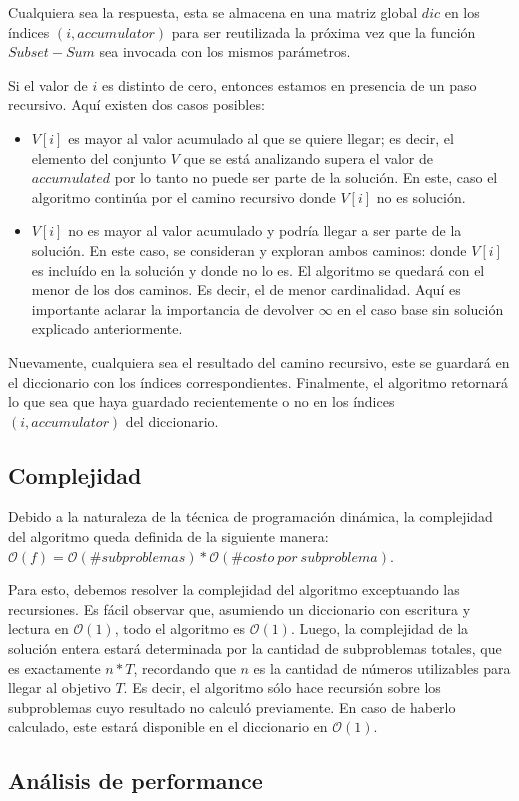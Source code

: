 Cualquiera sea la respuesta, esta se almacena en una matriz global $dic$ en los índices $(i, accumulator)$ para ser reutilizada la próxima vez que la función $Subset-Sum$ sea invocada con los mismos parámetros.

\vskip 8pt

Si el valor de $i$ es distinto de cero, entonces estamos en presencia de un paso recursivo. Aquí existen dos casos posibles:
\begin{itemize}
	\item $V[i]$ es mayor al valor acumulado al que se quiere llegar; es decir, el elemento del conjunto $V$ que se está analizando supera el valor de $accumulated$ por lo tanto no puede ser parte de la solución. En este, caso el algoritmo continúa por el camino recursivo donde $V[i]$ no es solución.
	\item $V[i]$ no es mayor al valor acumulado y podría llegar a ser parte de la solución. En este caso, se consideran y exploran ambos caminos: donde $V[i]$ es incluído en la solución y donde no lo es. El algoritmo se quedará con el menor de los dos caminos. Es decir, el de menor cardinalidad. Aquí es importante aclarar la importancia de devolver $\infty$ en el caso base sin solución explicado anteriormente.
\end{itemize}
Nuevamente, cualquiera sea el resultado del camino recursivo, este se guardará en el diccionario con los índices correspondientes. Finalmente, el algoritmo retornará lo que sea que haya guardado recientemente o no en los índices $(i, accumulator)$ del diccionario.

\subsection{Complejidad}
Debido a la naturaleza de la técnica de programación dinámica, la complejidad del algoritmo queda definida de la siguiente manera:
$\mathcal{O}(f) = \mathcal{O}(\#subproblemas) * \mathcal{O}(\#costo \ por \ subproblema)$.

\vskip 8pt

Para esto, debemos resolver la complejidad del algoritmo exceptuando las recursiones. Es fácil observar que, asumiendo un diccionario con escritura y lectura en $\mathcal{O}(1)$, todo el algoritmo es $\mathcal{O}(1)$. Luego, la complejidad de la solución entera estará determinada por la cantidad de subproblemas totales, que es exactamente $n * T$, recordando que $n$ es la cantidad de números utilizables para llegar al objetivo $T$. Es decir, el algoritmo sólo hace recursión sobre los subproblemas cuyo resultado no calculó previamente. En caso de haberlo calculado, este estará disponible en el diccionario en $\mathcal{O}(1)$.

\subsection{Análisis de performance}